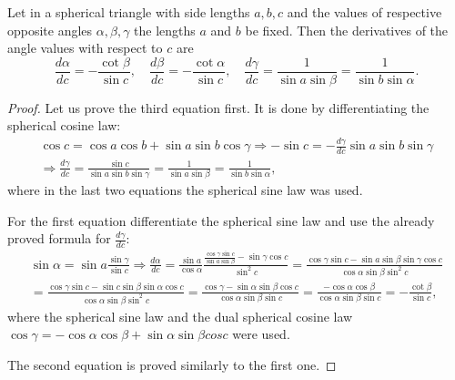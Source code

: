 \documentclass[10pt,a4paper]{amsart}
\begin{document}
\begin{lem}
\label{lem:SphTrig}
Let in a spherical triangle with side lengths $a, b, c$ and the values of respective opposite angles $\alpha, \beta, \gamma$ the lengths $a$ and $b$ be fixed.
Then the derivatives of the angle values with respect to $c$ are
\[
\frac{d\alpha}{dc} = -\frac{\cot\beta}{\sin c}, \quad
\frac{d\beta}{dc} = -\frac{\cot\alpha}{\sin c}, \quad
\frac{d\gamma}{dc} = \frac{1}{\sin a \sin\beta} = \frac{1}{\sin b \sin\alpha}.
\]
\end{lem}

\begin{proof}
Let us prove the third equation first.
It is done by differentiating the spherical cosine law:
\begin{multline*}
\cos c = \cos a \cos b + \sin a \sin b \cos\gamma \Rightarrow
-\sin c = - \frac{d\gamma}{dc}\sin a \sin b \sin\gamma\\
\Rightarrow \frac{d\gamma}{dc} = \frac{\sin c}{\sin a \sin b \sin \gamma} = \frac{1}{\sin a \sin\beta} = \frac{1}{\sin b \sin\alpha},
\end{multline*}
where in the last two equations the spherical sine law was used.

For the first equation differentiate the spherical sine law and use the already proved formula for $\frac{d\gamma}{dc}$:
\begin{multline*}
\sin\alpha = \sin a \frac{\sin\gamma}{\sin c} \Rightarrow
\frac{d\alpha}{dc} = \frac{\sin a}{\cos\alpha} \frac{\frac{\cos\gamma \sin c}{\sin a \sin\beta} - \sin\gamma \cos c}{\sin^2 c} = \frac{\cos\gamma \sin c - \sin a \sin\beta \sin\gamma \cos c}{\cos\alpha \sin\beta \sin^2 c}\\
= \frac{\cos\gamma \sin c - \sin c \sin\beta \sin\alpha \cos c}{\cos\alpha \sin\beta \sin^2 c} = \frac{\cos\gamma - \sin\alpha \sin\beta \cos c}{\cos\alpha \sin\beta \sin c} = \frac{-\cos\alpha \cos\beta}{\cos\alpha \sin\beta \sin c} = - \frac{\cot\beta}{\sin c},
\end{multline*}
where the spherical sine law and the dual spherical cosine law $\cos\gamma = -\cos\alpha\cos\beta + \sin\alpha\sin\beta cos c$ were used.

The second equation is proved similarly to the first one.
\end{proof}
\end{document}
